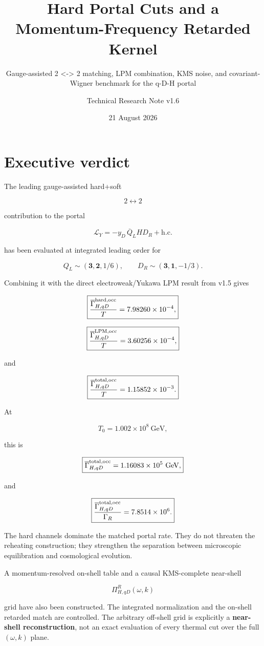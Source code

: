 \documentclass[
  10pt,
]{article}
\title{Hard Portal Cuts and a Momentum-Frequency Retarded Kernel}
\subtitle{Gauge-assisted 2 \textless-\textgreater{} 2 matching, LPM
combination, KMS noise, and covariant-Wigner benchmark for the q-D-H
portal}
\author{Technical Research Note v1.6}
\date{21 August 2026}
\begin{document}
\maketitle

{
\hypersetup{linkcolor=}
\setcounter{tocdepth}{3}
\tableofcontents
}
\section{Executive verdict}\label{executive-verdict}

The leading gauge-assisted hard+soft

\[
2\leftrightarrow2
\]

contribution to the portal

\[
\mathcal L_Y=-y_D\,\overline Q_LHD_R+\mathrm{h.c.}
\]

has been evaluated at integrated leading order for

\[
Q_L\sim(\mathbf3,\mathbf2,1/6),
\qquad
D_R\sim(\mathbf3,\mathbf1,-1/3).
\]

Combining it with the direct electroweak/Yukawa LPM result from v1.5
gives

\[
\boxed{
\frac{\overline\Gamma_{H,qD}^{\rm hard,occ}}{T}
=7.98260\times10^{-4},
}
\]

\[
\boxed{
\frac{\overline\Gamma_{H,qD}^{\rm LPM,occ}}{T}
=3.60256\times10^{-4},
}
\]

and

\[
\boxed{
\frac{\overline\Gamma_{H,qD}^{\rm total,occ}}{T}
=1.15852\times10^{-3}.
}
\]

At

\[
T_0=1.002\times10^8\ \mathrm{GeV},
\]

this is

\[
\boxed{
\overline\Gamma_{H,qD}^{\rm total,occ}
=1.16083\times10^5\ \mathrm{GeV},
}
\]

and

\[
\boxed{
\frac{\overline\Gamma_{H,qD}^{\rm total,occ}}
{\Gamma_R}
=7.8514\times10^6.
}
\]

The hard channels dominate the matched portal rate. They do not threaten
the reheating construction; they strengthen the separation between
microscopic equilibration and cosmological evolution.

A momentum-resolved on-shell table and a causal KMS-complete near-shell

\[
\Pi_{H,qD}^R(\omega,k)
\]

grid have also been constructed. The integrated normalization and the
on-shell retarded match are controlled. The arbitrary off-shell grid is
explicitly a \textbf{near-shell reconstruction}, not an exact evaluation
of every thermal cut over the full \((\omega,k)\) plane.
\end{document}
